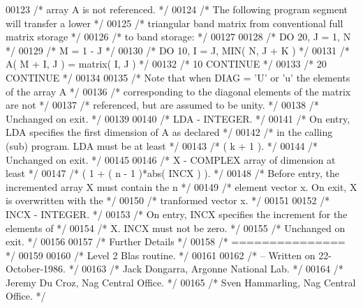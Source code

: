 \begin{DoxyCode}
00123 \textcolor{comment}{/*           array A is not referenced. */}
00124 \textcolor{comment}{/*           The following program segment will transfer a lower */}
00125 \textcolor{comment}{/*           triangular band matrix from conventional full matrix storage */}
00126 \textcolor{comment}{/*           to band storage: */}
00127 
00128 \textcolor{comment}{/*                 DO 20, J = 1, N */}
00129 \textcolor{comment}{/*                    M = 1 - J */}
00130 \textcolor{comment}{/*                    DO 10, I = J, MIN( N, J + K ) */}
00131 \textcolor{comment}{/*                       A( M + I, J ) = matrix( I, J ) */}
00132 \textcolor{comment}{/*              10    CONTINUE */}
00133 \textcolor{comment}{/*              20 CONTINUE */}
00134 
00135 \textcolor{comment}{/*           Note that when DIAG = 'U' or 'u' the elements of the array A */}
00136 \textcolor{comment}{/*           corresponding to the diagonal elements of the matrix are not */}
00137 \textcolor{comment}{/*           referenced, but are assumed to be unity. */}
00138 \textcolor{comment}{/*           Unchanged on exit. */}
00139 
00140 \textcolor{comment}{/*  LDA    - INTEGER. */}
00141 \textcolor{comment}{/*           On entry, LDA specifies the first dimension of A as declared */}
00142 \textcolor{comment}{/*           in the calling (sub) program. LDA must be at least */}
00143 \textcolor{comment}{/*           ( k + 1 ). */}
00144 \textcolor{comment}{/*           Unchanged on exit. */}
00145 
00146 \textcolor{comment}{/*  X      - COMPLEX          array of dimension at least */}
00147 \textcolor{comment}{/*           ( 1 + ( n - 1 )*abs( INCX ) ). */}
00148 \textcolor{comment}{/*           Before entry, the incremented array X must contain the n */}
00149 \textcolor{comment}{/*           element vector x. On exit, X is overwritten with the */}
00150 \textcolor{comment}{/*           tranformed vector x. */}
00151 
00152 \textcolor{comment}{/*  INCX   - INTEGER. */}
00153 \textcolor{comment}{/*           On entry, INCX specifies the increment for the elements of */}
00154 \textcolor{comment}{/*           X. INCX must not be zero. */}
00155 \textcolor{comment}{/*           Unchanged on exit. */}
00156 
00157 \textcolor{comment}{/*  Further Details */}
00158 \textcolor{comment}{/*  =============== */}
00159 
00160 \textcolor{comment}{/*  Level 2 Blas routine. */}
00161 
00162 \textcolor{comment}{/*  -- Written on 22-October-1986. */}
00163 \textcolor{comment}{/*     Jack Dongarra, Argonne National Lab. */}
00164 \textcolor{comment}{/*     Jeremy Du Croz, Nag Central Office. */}
00165 \textcolor{comment}{/*     Sven Hammarling, Nag Central Office. */}

\end{DoxyCode}
